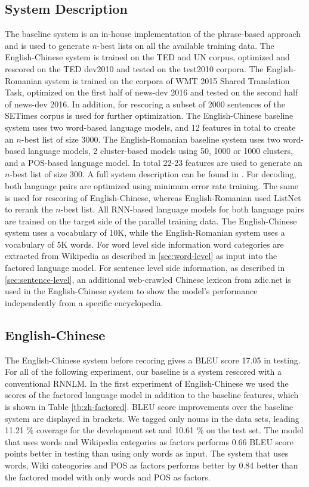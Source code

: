 \documentclass[a4paper]{article}
\begin{document}
\subsection{System Description}
The baseline system is an in-house implementation of the phrase-based approach and is used to generate $n$-best lists on all the available training data. The English-Chinese system is trained on the TED and UN corpus, optimized and rescored on the TED dev2010 and tested on the test2010 corpora.
The English-Romanian system is trained on the corpora of WMT 2015 Shared Translation Task, optimized on the first half of news-dev 2016 and tested on the second half of news-dev 2016. In addition, for rescoring a subset of 2000 sentences of the SETimes corpus is used for further optimization.
The English-Chinese baseline system uses two word-based language models, and 12 features in total to create an $n$-best list of size 3000.
The English-Romanian baseline system uses two word-based language models, 2 cluster-based models using 50, 1000 or 1000 clusters, and a POS-based language model. In total 22-23 features are used to generate an $n$-best list of size 300. A full system description can be found in \cite{niehuesusing}.
For decoding, both language pairs are optimized using minimum error rate training. The same is used for rescoring of English-Chinese, whereas English-Romanian used ListNet to rerank the $n$-best list.
All RNN-based language models for both language pairs are trained on the target side of the parallel training data. The English-Chinese system uses a vocabulary of 10K, while the English-Romanian system uses a vocabulary of 5K words. For word level side information word categories are extracted from Wikipedia as described in \ref{sec:word-level} as input into the factored language model.
For sentence level side information, as described in \ref{sec:sentence-level}, an additional web-crawled Chinese lexicon from zdic.net \cite{zdic} is used in the English-Chinese system to show the model's performance independently from a specific encyclopedia.


\subsection{English-Chinese}
The English-Chinese system before recoring gives a BLEU score 17.05 in testing. For all of the following experiment, our baseline is a system rescored with a conventional RNNLM.
In the first experiment of English-Chinese we used the scores of the factored language model in addition to the baseline features, which is shown in Table \ref{tb:zh-factored}. BLEU score improvements over the baseline system are displayed in brackets. We tagged only nouns in the data sets, leading 11.21 \% coverage for the development set and 10.61 \% on the test set. The model that uses words and Wikipedia categories as factors performs 0.66 BLEU score points better in testing than using only words as input. The system that uses words, Wiki cateogories and POS as factors performs better by 0.84 better than the factored model with only words and POS as factors.
\end{document}
